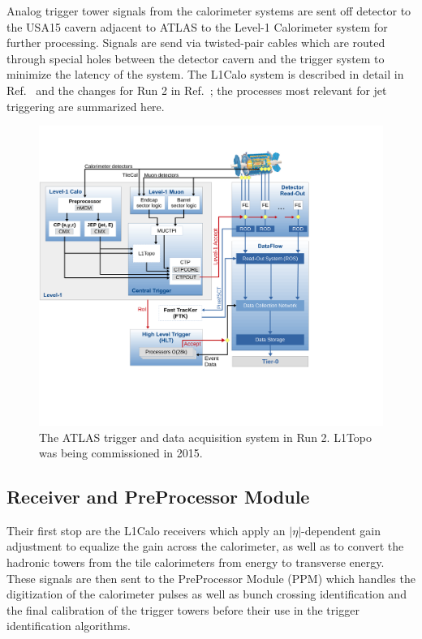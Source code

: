 Analog trigger tower signals from the calorimeter systems are sent off detector to the USA15 cavern adjacent to ATLAS to the Level-1 Calorimeter system for further processing.  Signals are send via twisted-pair cables which are routed through special holes between the detector cavern and the trigger system to minimize the latency of the system. The L1Calo system is described in detail in Ref.~\cite{L1Calo_Run1} and the changes for Run 2 in Ref.~\cite{L1Calo_Run2}; the processes most relevant for jet triggering are summarized here.

\begin{figure}[]
	\centering
	\includegraphics[width=0.8\columnwidth]{figures/Detector/TriggerOverview.png}
	\caption{The ATLAS trigger and data acquisition system in Run 2.  L1Topo was being commissioned in 2015. \cite{L1Calo_Run2}
	}
	\label{fig:TriggerOverview}
\end{figure} 

\subsection{Receiver and PreProcessor Module}
\label{sec:L1Calo}

Their first stop are the L1Calo receivers which apply an $|\eta|$-dependent gain adjustment to equalize the gain across the calorimeter, as well as to convert the hadronic towers from the tile calorimeters from energy to transverse energy.  These signals are then sent to the PreProcessor Module (PPM) which handles the digitization of the calorimeter pulses as well as bunch crossing identification and the final calibration of the trigger towers before their use in the trigger identification algorithms.

